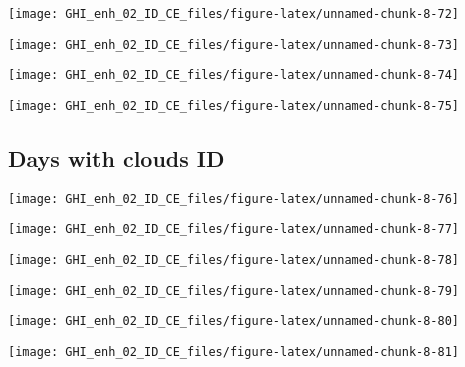 \documentclass[
  10pt,
  a4paper,oneside]{article}
\begin{document}
\begin{center}\texttt{[image: GHI\_enh\_02\_ID\_CE\_files/figure-latex/unnamed-chunk-8-72]} \end{center}

\begin{center}\texttt{[image: GHI\_enh\_02\_ID\_CE\_files/figure-latex/unnamed-chunk-8-73]} \end{center}

\begin{center}\texttt{[image: GHI\_enh\_02\_ID\_CE\_files/figure-latex/unnamed-chunk-8-74]} \end{center}

\begin{center}\texttt{[image: GHI\_enh\_02\_ID\_CE\_files/figure-latex/unnamed-chunk-8-75]} \end{center}

\FloatBarrier

\hypertarget{days-with-clouds-id}{%
\subsection{Days with clouds ID}\label{days-with-clouds-id}}

\begin{center}\texttt{[image: GHI\_enh\_02\_ID\_CE\_files/figure-latex/unnamed-chunk-8-76]} \end{center}

\begin{center}\texttt{[image: GHI\_enh\_02\_ID\_CE\_files/figure-latex/unnamed-chunk-8-77]} \end{center}

\begin{center}\texttt{[image: GHI\_enh\_02\_ID\_CE\_files/figure-latex/unnamed-chunk-8-78]} \end{center}

\begin{center}\texttt{[image: GHI\_enh\_02\_ID\_CE\_files/figure-latex/unnamed-chunk-8-79]} \end{center}

\begin{center}\texttt{[image: GHI\_enh\_02\_ID\_CE\_files/figure-latex/unnamed-chunk-8-80]} \end{center}

\begin{center}\texttt{[image: GHI\_enh\_02\_ID\_CE\_files/figure-latex/unnamed-chunk-8-81]} \end{center}
\end{document}
